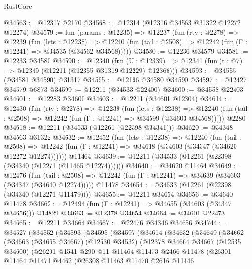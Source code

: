 \begin{lexlean}{RustCore}
\begin{coremodule}
@34563 := @12317 @2170
@34568 := @12314 (@12316 @34563 @31322 @12272 @12274)
@34579 := fun (params : @12235) =>
  @12237
    (fun (rty : @2278) =>
    @12239
      (fun (lets : @12238) =>
      @12240 (fun (tail : @2508) => @12242 (fun (Γ : @12241) => @34535 (@34562 @34568)))))
@34580 := @12236 @34579
@34581 := @12233 @34580
@34590 := @12340
    (fun (U : @12339) => @12341 (fun (t : @7) => @12349 (@12211 (@12355 @31319 @12229) @12366)))
@34593 := @34555 (@34581 @34590) @31317
@34595 := @12196 @34580 @34590
@34597 := @12427 @34579 @6873
@34599 := @12211 (@34533 @22400)
@34600 := @34558 @22403
@34601 := @12283 @34600
@34603 := @12211 (@34601 @12304)
@34614 := @12430
    (fun (rty : @2278) =>
    @12239
      (fun (lets : @12238) =>
      @12240 (fun (tail : @2508) => @12242 (fun (Γ : @12241) => @34599 (@34603 @34568)))))
    @2280
@34618 := @12211 (@34533 (@12261 (@22398 @34341)))
@34620 := @34348 @34563 @31322
@34632 := @12452
    (fun (lets : @12238) =>
    @12240
      (fun (tail : @2508) =>
      @12242 (fun (Γ : @12241) => @34618 (@34603 (@34347 (@34620 @12272 @12274))))))
    @11464
@34639 := @12211 (@34533 (@12261 (@22398 (@34340 (@12271 (@11465 @12274))))))
@34640 := @34620 @11464
@34649 := @12476
    (fun (tail : @2508) => @12242 (fun (Γ : @12241) => @34639 (@34603 (@34347 (@34640 @12274)))))
    @11478
@34654 := @34533 (@12261 (@22398 (@34340 (@12271 @11479))))
@34655 := @12211 @34654
@34656 := @34640 @11478
@34662 := @12494 (fun (Γ : @12241) => @34655 (@34603 (@34347 @34656))) @14829
@34663 := @12378 @34654
@34664 := @34601 @22473
@34665 := @12211 @34664
@34667 := @22476 @34346 @34656
@34744 := @34527
    (@34552
      (@34593
        (@34595
          (@34597
            (@34614
              (@34632
                (@34649
                  (@34662
                    (@34663
                      (@34665 @34667)
                      (@12530 @34532)
                      (@12378
                        @34664
                        @34667
                        (@12535 @34600)
                        (@26291
                          @1541
                          @290
                          @11
                          @11464
                          @11473
                          @2466
                          @11478
                          (@26301
                            @11464
                            @11471
                            @4462
                            (@26308
                              @11463
                              @11470
                              @2616
                              @11446

\end{coremodule}
\end{lexlean}
